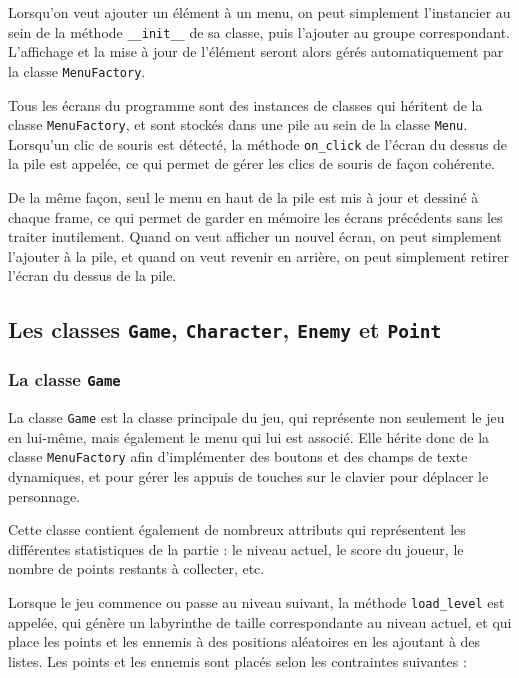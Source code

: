 \documentclass[12pt]{scrreprt} %
\begin{document}
Lorsqu'on veut ajouter un élément à un menu, on peut simplement l'instancier au sein de la méthode \texttt{\_\_init\_\_} de sa classe, puis l'ajouter au groupe correspondant. L'affichage et la mise à jour de l'élément seront alors gérés automatiquement par la classe \texttt{MenuFactory}.

Tous les écrans du programme sont des instances de classes qui héritent de la classe \texttt{MenuFactory}, et sont stockés dans une pile au sein de la classe \texttt{Menu}. Lorsqu'un clic de souris est détecté, la méthode \texttt{on\_click} de l'écran du dessus de la pile est appelée, ce qui permet de gérer les clics de souris de façon cohérente.

De la même façon, seul le menu en haut de la pile est mis à jour et dessiné à chaque frame, ce qui permet de garder en mémoire les écrans précédents sans les traiter inutilement. Quand on veut afficher un nouvel écran, on peut simplement l'ajouter à la pile, et quand on veut revenir en arrière, on peut simplement retirer l'écran du dessus de la pile.

\subsection{Les classes \texttt{Game}, \texttt{Character}, \texttt{Enemy} et \texttt{Point}}

\subsubsection{La classe \texttt{Game}}

La classe \texttt{Game} est la classe principale du jeu, qui représente non seulement le jeu en lui-même, mais également le menu qui lui est associé. Elle hérite donc de la classe \texttt{MenuFactory} afin d'implémenter des boutons et des champs de texte dynamiques, et pour gérer les appuis de touches sur le clavier pour déplacer le personnage.

Cette classe contient également de nombreux attributs qui représentent les différentes statistiques de la partie : le niveau actuel, le score du joueur, le nombre de points restants à collecter, etc.

Lorsque le jeu commence ou passe au niveau suivant, la méthode \texttt{load\_level} est appelée, qui génère un labyrinthe de taille correspondante au niveau actuel, et qui place les points et les ennemis à des positions aléatoires en les ajoutant à des listes. Les points et les ennemis sont placés selon les contraintes suivantes :
\end{document}
